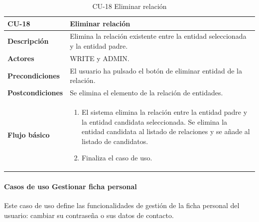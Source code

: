\begin{table} [H]
    \centering
    \setlength{\leftmargini}{0.4cm}
	\resizebox{14cm}{!} { %
    \begin{tabular}{| m{3cm} | m{11cm} |}   
    \hline
	  \textbf{CU-18} & \textbf{Eliminar relación} \\\hline
	  \textbf{Descripción} & Elimina la relación existente entre la entidad seleccionada y la entidad padre. \\\hline
	  \textbf{Actores} & WRITE y ADMIN. \\\hline
	  \textbf{Precondiciones} & El usuario ha pulsado el botón de eliminar entidad de la relación. \\\hline
	  \textbf{Postcondiciones} & Se elimina el elemento de la relación de entidades. \\\hline
	  \textbf{Flujo básico} & 
		\begin{enumerate}
	  	\item El sistema elimina la relación entre la entidad padre y la entidad candidata seleccionada. Se elimina la entidad candidata al listado de relaciones y se añade al listado de candidatos.
		\item Finaliza el caso de uso.				
	  \end{enumerate} 	  	  
	  \\\hline
    \end{tabular}
    } %
    \caption{CU-18 Eliminar relación}
    \label{tab:cu-eliminar-relacion}
\end{table}


\paragraph{Casos de uso Gestionar ficha personal} 

Este caso de uso define las funcionalidades de gestión de la ficha personal del usuario: cambiar su contraseña o sus datos de contacto.

